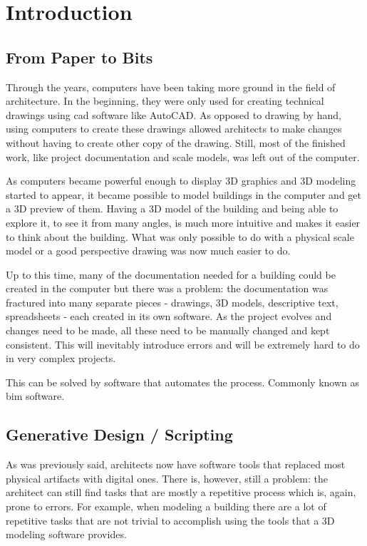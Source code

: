 
\chapter{Introduction}
\label{chapter:introduction}


\section{From Paper to Bits}
Through the years, computers have been taking more ground in the field of architecture.
In the beginning, they were only used for creating technical drawings using \gls{cad} software like AutoCAD.
As opposed to drawing by hand, using computers to create these drawings allowed architects to make changes without having to create other copy of the drawing.
Still, most of the finished work, like project documentation and scale models, was left out of the computer.

As computers became powerful enough to display 3D graphics and 3D modeling started to appear, it became possible to model buildings in the computer and get a 3D preview of them.
Having a 3D model of the building and being able to explore it, to see it from many angles, is much more intuitive and makes it easier to think about the building.
What was only possible to do with a physical scale model or a good perspective drawing was now much easier to do.

Up to this time, many of the documentation needed for a building could be created in the computer but there was a problem: the documentation was fractured into many separate pieces - drawings, 3D models, descriptive text, spreadsheets - each created in its own software.
As the project evolves and changes need to be made, all these need to be manually changed and kept consistent.
This will inevitably introduce errors and will be extremely hard to do in very complex projects.

This can be solved by software that automates the process. Commonly known as \gls{bim} software.


\section{Generative Design / Scripting}
As was previously said, architects now have software tools that replaced most physical artifacts with digital ones.
There is, however, still a problem: the architect can still find tasks that are mostly a repetitive process which is, again, prone to errors.
For example, when modeling a building there are a lot of repetitive tasks that are not trivial to accomplish using the tools that a 3D modeling software provides.

